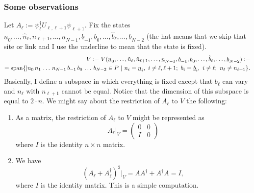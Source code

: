 \subsubsection{Some observations}
\begin{statement}
Let $A_{\ell} := \psi_\ell^\dagger U_{\ell,\ell+1} \psi_{\ell+1}$. Fix the states $\underline{n}_0,\ldots,\hat{n}_{\ell},\hat{n}_{\ell+1},\ldots,\underline{n}_{N-1},\underline{b}_{-1},\underline{b}_0,\ldots,\hat{b}_{\ell},\ldots,\underline{b}_{N-2}$ (the hat means that we skip that site or link and I use the underline to mean that the state is fixed).
\[\begin{split}
V:=V(\underline{n}_0,\ldots,\hat{n}_{\ell},\hat{n}_{\ell+1},\ldots,\underline{n}_{N-1},\underline{b}_{-1},\underline{b}_0,\ldots,\hat{b}_{\ell},\ldots,\underline{b}_{N-2}) :=\\= \operatorname{span} \{ |n_0\, n_1\, \ldots\, n_{N-1}\, b_{-1}\, b_0\, \ldots\, b_{N-2} \in P \ | \ n_i = \underline{n}_i, \ i \neq \ell, \ell+1; \ b_i = \underline{b}_{i}, \ i \neq \ell; \ n_{\ell} \neq n_{\ell+1}  \}.
\end{split}
\]
Basically, I define a subspace in which everything is fixed except that $b_{\ell}$ can vary and $n_{\ell}$ with $n_{\ell+1}$ cannot be equal. Notice that the dimension of this subspace is equal to $2\cdot n$. We might say about the restriction of $A_{\ell}$ to $V$ the following:
\begin{enumerate}[1)]
\item As a matrix, the restriction of $A_{\ell}$ to $V$ might be represented as
\[
A_{\ell}|_V = \begin{pmatrix}
0 & 0 \\
I & 0
\end{pmatrix}
\]
where $I$ is the identity $n \times n$ matrix.
\item We have
\[
(A_{\ell} + A_{\ell}^\dagger)^2|_V = AA^\dagger + A^\dagger A= I,
\]
where $I$ is the identity matrix. This is a simple computation.
\end{enumerate}
\end{statement}
%
